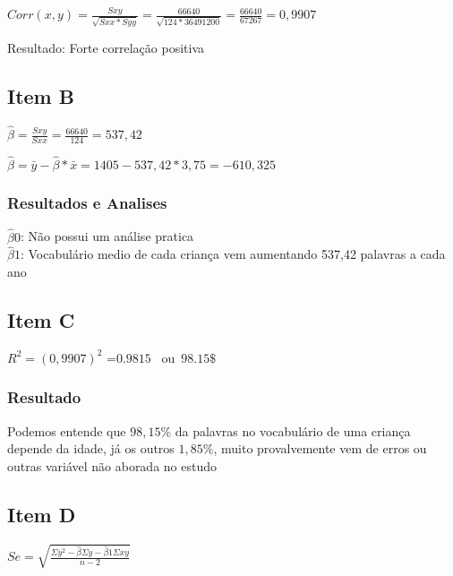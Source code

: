 \documentclass{article}
\begin{document}
            \begin{flushleft}
                $Corr(x,y) = \frac{Sxy}{\sqrt{Sxx * Syy}} = \frac{66640}{\sqrt{124 * 36491200}} = \frac{66640}{67267} = 0,9907 $

            \end{flushleft}
            
            Resultado: Forte correlação positiva
    \subsection{Item B}
    
            \begin{flushleft}

                $\hat{\beta} = \frac{Sxy}{Sxx} = \frac{66640}{124} = 537,42$

                $\hat{\beta} = \bar{y} - \hat{\beta} * \bar{x} = 1405 -537,42 * 3,75 = -610,325$
            \end{flushleft}
            
            \subsubsection{Resultados e Analises}

            $\hat{\beta}0 $: Não possui um análise pratica \\    
            $\hat{\beta}1 $: Vocabulário medio de cada criança vem aumentando 537,42 palavras a cada ano

    \subsection{Item C}
            
            \begin{flushleft}
                $R^2 = (0,9907)^2$ =$0.9815 $  \ ou\  $ 98.15\$$
            \end{flushleft}

        \subsubsection{Resultado}
        Podemos entende que $98,15\% $ da palavras no vocabulário de uma criança depende da idade, 
        já os outros $1,85\%$, muito provalvemente vem de erros ou outras variável não aborada no estudo
    
    \subsection{Item D}
    \begin{flushleft}
        $Se = \sqrt{ \frac{\Sigma y^2 - \hat{\beta } \Sigma y - \hat{\beta}1 \Sigma xy }{n-2}}$
    \end{flushleft}   
\end{document}
